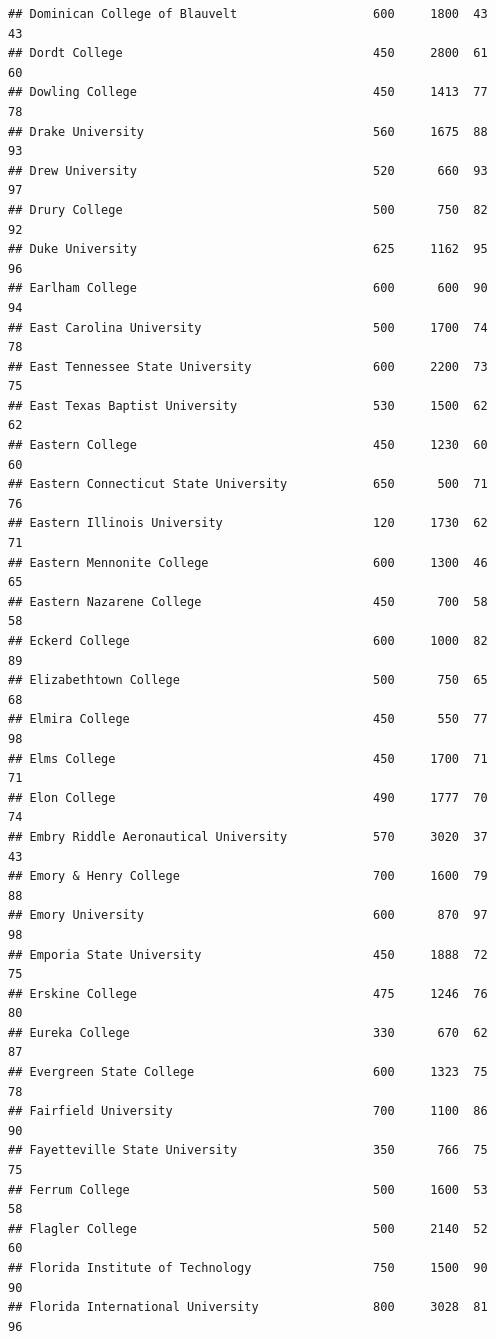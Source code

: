 \documentclass[
]{article}
\begin{document}
\begin{verbatim}
## Dominican College of Blauvelt                   600     1800  43       43
## Dordt College                                   450     2800  61       60
## Dowling College                                 450     1413  77       78
## Drake University                                560     1675  88       93
## Drew University                                 520      660  93       97
## Drury College                                   500      750  82       92
## Duke University                                 625     1162  95       96
## Earlham College                                 600      600  90       94
## East Carolina University                        500     1700  74       78
## East Tennessee State University                 600     2200  73       75
## East Texas Baptist University                   530     1500  62       62
## Eastern College                                 450     1230  60       60
## Eastern Connecticut State University            650      500  71       76
## Eastern Illinois University                     120     1730  62       71
## Eastern Mennonite College                       600     1300  46       65
## Eastern Nazarene College                        450      700  58       58
## Eckerd College                                  600     1000  82       89
## Elizabethtown College                           500      750  65       68
## Elmira College                                  450      550  77       98
## Elms College                                    450     1700  71       71
## Elon College                                    490     1777  70       74
## Embry Riddle Aeronautical University            570     3020  37       43
## Emory & Henry College                           700     1600  79       88
## Emory University                                600      870  97       98
## Emporia State University                        450     1888  72       75
## Erskine College                                 475     1246  76       80
## Eureka College                                  330      670  62       87
## Evergreen State College                         600     1323  75       78
## Fairfield University                            700     1100  86       90
## Fayetteville State University                   350      766  75       75
## Ferrum College                                  500     1600  53       58
## Flagler College                                 500     2140  52       60
## Florida Institute of Technology                 750     1500  90       90
## Florida International University                800     3028  81       96

\end{verbatim}
\end{document}
